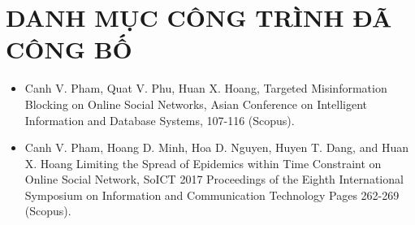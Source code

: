 \chapter*{DANH MỤC CÔNG TRÌNH ĐÃ CÔNG BỐ}


\begin{itemize}
	\item Canh V. Pham, Quat V. Phu, Huan X. Hoang, Targeted Misinformation Blocking on Online Social Networks, Asian Conference on Intelligent Information and Database Systems, 107-116 (Scopus).
	
	\item Canh V. Pham, Hoang D. Minh, Hoa D. Nguyen, Huyen T. Dang, and Huan X. Hoang Limiting the Spread of Epidemics within Time Constraint on Online Social Network, SoICT 2017 Proceedings of the Eighth International Symposium on Information and Communication Technology Pages 262-269 (Scopus).
	
\end{itemize}